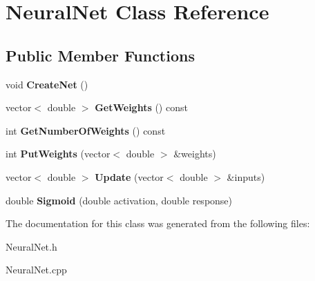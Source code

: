 \hypertarget{class_neural_net}{}\section{Neural\+Net Class Reference}
\label{class_neural_net}
\subsection*{Public Member Functions}
\begin{DoxyCompactItemize}
\item 
\hypertarget{class_neural_net_a233170e73af54b4d4b8428b6bcff8582}{}\label{class_neural_net_a233170e73af54b4d4b8428b6bcff8582} 
void {\bfseries Create\+Net} ()
\item 
\hypertarget{class_neural_net_a992461ce90070679874a2633e7982499}{}\label{class_neural_net_a992461ce90070679874a2633e7982499} 
vector$<$ double $>$ {\bfseries Get\+Weights} () const
\item 
\hypertarget{class_neural_net_a3f61ac99f3395e8610888da6c2b6b02d}{}\label{class_neural_net_a3f61ac99f3395e8610888da6c2b6b02d} 
int {\bfseries Get\+Number\+Of\+Weights} () const
\item 
\hypertarget{class_neural_net_a56b18146abd6e8fc5b87cc8e4574b7db}{}\label{class_neural_net_a56b18146abd6e8fc5b87cc8e4574b7db} 
int {\bfseries Put\+Weights} (vector$<$ double $>$ \&weights)
\item 
\hypertarget{class_neural_net_a728edec8df03d4e35727420f20a1c986}{}\label{class_neural_net_a728edec8df03d4e35727420f20a1c986} 
vector$<$ double $>$ {\bfseries Update} (vector$<$ double $>$ \&inputs)
\item 
\hypertarget{class_neural_net_ab95e23b213c1199c41d0ece93f57bef6}{}\label{class_neural_net_ab95e23b213c1199c41d0ece93f57bef6} 
double {\bfseries Sigmoid} (double activation, double response)
\end{DoxyCompactItemize}


The documentation for this class was generated from the following files\+:\begin{DoxyCompactItemize}
\item 
Neural\+Net.\+h\item 
Neural\+Net.\+cpp\end{DoxyCompactItemize}
